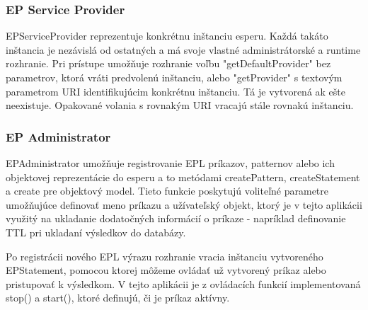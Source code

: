 		\subsubsection{EP Service Provider}
		EPServiceProvider reprezentuje konkrétnu inštanciu esperu. Každá takáto inštancia je nezávislá od ostatných a má svoje vlastné administrátorské a runtime rozhranie. Pri prístupe umožňuje rozhranie voľbu "getDefaultProvider" bez parametrov, ktorá vráti predvolenú inštanciu, alebo "getProvider" s textovým parametrom URI identifikujúcim konkrétnu inštanciu. Tá je vytvorená ak ešte neexistuje. Opakované volania s rovnakým URI vracajú stále rovnakú inštanciu.
		
		\subsubsection{EP Administrator}
		EPAdministrator umožňuje registrovanie EPL príkazov, patternov alebo ich objektovej reprezentácie do esperu a to metódami createPattern, createStatement a create pre objektový model. Tieto funkcie poskytujú voliteľné parametre umožňujúce definovať meno príkazu a užívateľský objekt, ktorý je v tejto aplikácii využitý na ukladanie dodatočných informácií o príkaze - napríklad definovanie TTL pri ukladaní výsledkov do databázy.
		
		Po registrácii nového EPL výrazu rozhranie vracia inštanciu vytvoreného EPStatement, pomocou ktorej môžeme ovládať už vytvorený príkaz alebo pristupovať k výsledkom. V tejto aplikácii je z ovládacích funkcií implementovaná stop() a start(), ktoré definujú, či je príkaz aktívny.
		
